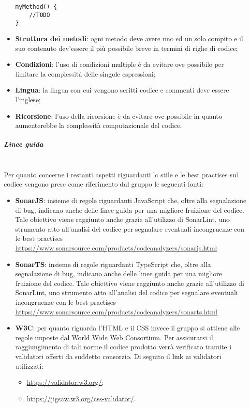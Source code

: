 \begin{itemize}
\begin{lstlisting}
myMethod() {
	//TODO
}
\end{lstlisting}
	\item \textbf{Struttura dei metodi}: ogni metodo deve avere uno ed un solo compito e il suo contenuto dev'essere il più possibile breve in termini di righe di codice;
	\item \textbf{Condizioni}: l'uso di condizioni multiple è da evitare ove possibile per limitare la complessità delle singole espressioni;
	\item \textbf{Lingua}: la lingua con cui vengono scritti codice e commenti deve essere l'inglese;
	\item \textbf{Ricorsione}: l'uso della ricorsione è da evitare ove possibile in quanto aumenterebbe la complessità computazionale del codice.
\end{itemize}
\subparagraph*{Linee guida}\mbox{}\\ [1mm]
Per quanto concerne i restanti aspetti riguardanti lo stile e le best practises sul codice vengono prese come riferimento dal gruppo le seguenti fonti:
\begin{itemize}
	\item \textbf{SonarJS}: insieme di regole riguardanti JavaScript che, oltre alla segnalazione di bug, indicano anche delle linee guida per una migliore fruizione del codice. Tale obiettivo viene raggiunto anche grazie all'utilizzo di SonarLint, uno strumento atto all'analisi del codice per segnalare eventuali incongruenze con le best practises\\
	\centering\url{https://www.sonarsource.com/products/codeanalyzers/sonarjs.html}
	\item \textbf{SonarTS}: insieme di regole riguardanti TypeScript che, oltre alla segnalazione di bug, indicano anche delle linee guida per una migliore fruizione del codice. Tale obiettivo viene raggiunto anche grazie all'utilizzo di SonarLint, uno strumento atto all'analisi del codice per segnalare eventuali incongruenze con le best practises\\
	\centering\url{https://www.sonarsource.com/products/codeanalyzers/sonarts.html}
	\item \textbf{W3C}: per quanto riguarda l'HTML e il CSS invece il gruppo si attiene alle regole imposte dal World Wide Web Consortium. Per assicurarsi il raggiungimento di tali norme il codice prodotto verrà verificato tramite i validatori offerti da suddetto consorzio. Di seguito il link ai validatori utilizzati:
	\begin{itemize}
		\item \url{https://validator.w3.org/};
		\item \url{https://jigsaw.w3.org/css-validator/}.
	\end{itemize}
\end{itemize}
